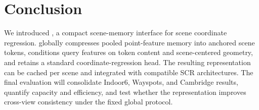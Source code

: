 \section{Conclusion}

We introduced \method{}, a compact scene-memory interface for scene coordinate regression. \method{} globally compresses pooled point-feature memory into anchored scene tokens, conditions query features on token content and scene-centered geometry, and retains a standard coordinate-regression head. The resulting representation can be cached per scene and integrated with compatible SCR architectures. The final evaluation will consolidate Indoor6, Wayspots, and Cambridge results, quantify capacity and efficiency, and test whether the representation improves cross-view consistency under the fixed global protocol.
